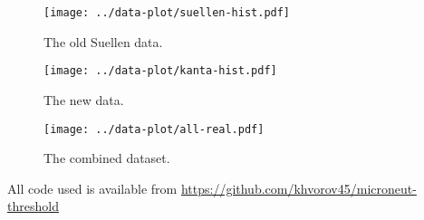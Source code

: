\documentclass[11pt]{article}
\begin{document}




\begin{figure}[htp]
    \centering
    \texttt{[image: ../data-plot/suellen-hist.pdf]}
    \caption{
        The old Suellen data.
    }
    \label{fig:suellen}
\end{figure}

\begin{figure}[htp]
    \centering
    \texttt{[image: ../data-plot/kanta-hist.pdf]}
    \caption{
        The new data.
    }
    \label{fig:kanta}
\end{figure}

\begin{figure}[htp]
    \centering
    \texttt{[image: ../data-plot/all-real.pdf]}
    \caption{
        The combined dataset.
    }
    \label{fig:combined}
\end{figure}



All code used is available from
\url{https://github.com/khvorov45/microneut-threshold}
\end{document}
